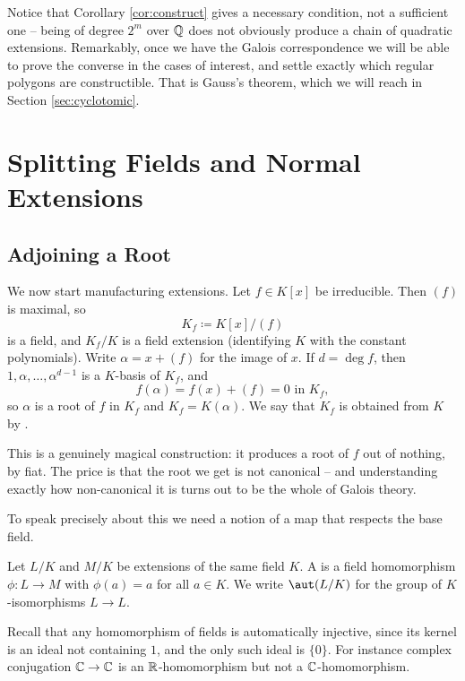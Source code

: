 \documentclass[a4paper]{scrartcl}
\begin{document}
Notice that Corollary \ref{cor:construct} gives a necessary condition, not a sufficient one -- being of degree $2^m$ over $\mathbb{Q}$ does not obviously produce a chain of quadratic extensions. Remarkably, once we have the Galois correspondence we will be able to prove the converse in the cases of interest, and settle exactly which regular polygons are constructible. That is Gauss's theorem, which we will reach in Section \ref{sec:cyclotomic}.

\section{Splitting Fields and Normal Extensions}

\subsection{Adjoining a Root}

We now start manufacturing extensions. Let $f \in K[x]$ be irreducible. Then $(f)$ is maximal, so
$$K_f \coloneqq K[x]/(f)$$
is a field, and $K_f/K$ is a field extension (identifying $K$ with the constant polynomials). Write $\alpha = x + (f)$ for the image of $x$. If $d = \deg f$, then $1, \alpha, \dots, \alpha^{d-1}$ is a $K$-basis of $K_f$, and
$$f(\alpha) = f(x) + (f) = 0 \text{ in } K_f,$$
so $\alpha$ is a root of $f$ in $K_f$ and $K_f = K(\alpha)$. We say that $K_f$ is obtained from $K$ by .

This is a genuinely magical construction: it produces a root of $f$ out of nothing, by fiat. The price is that the root we get is not canonical -- and understanding exactly how non-canonical it is turns out to be the whole of Galois theory.

To speak precisely about this we need a notion of a map that respects the base field.

\begin{definition}[$K$-homomorphism]
	Let $L/K$ and $M/K$ be extensions of the same field $K$. A  is a field homomorphism $\phi : L \to M$ with $\phi(a) = a$ for all $a \in K$. We write $\aut(L/K)$ for the group of $K$-isomorphisms $L \to L$.
\end{definition}

Recall that any homomorphism of fields is automatically injective, since its kernel is an ideal not containing $1$, and the only such ideal is $\{0\}$. For instance complex conjugation $\mathbb{C} \to \mathbb{C}$ is an $\mathbb{R}$-homomorphism but not a $\mathbb{C}$-homomorphism.
\end{document}
